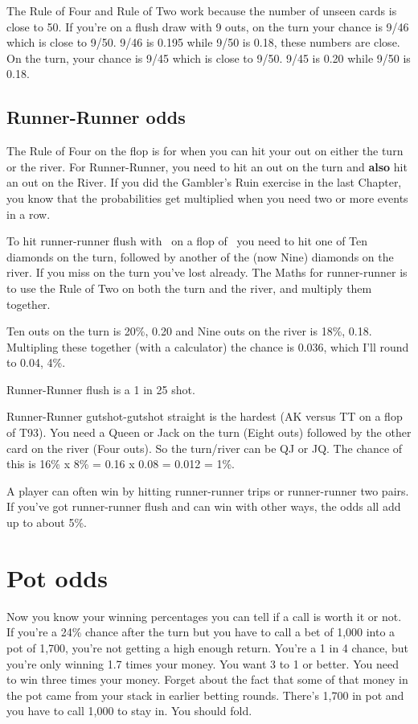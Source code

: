 The Rule of Four and Rule of Two work because the number of unseen
cards is close to 50. If you're on a flush draw with 9 outs, on the
turn your chance is 9/46 which is close to 9/50. 9/46 is 0.195 while
9/50 is 0.18, these numbers are close. On the turn, your chance is
9/45 which is close to 9/50. 9/45 is 0.20 while 9/50 is 0.18.

\subsection{Runner-Runner odds}

The Rule of Four on the flop is for when you can hit your out on
either the turn or the river. For Runner-Runner, you need to hit an
out on the turn and \textbf{also} hit an out on the River. If you did
the Gambler's Ruin exercise in the last Chapter, you know that the
probabilities get multiplied when you need two or more events in a
row.

To hit runner-runner flush with \eigd\fourd\ on a flop of \Ad\Qh\ninec\,
you need to hit one of Ten diamonds on the turn, followed by another
of the (now Nine) diamonds on the river. If you miss on the turn
you've lost already. The Maths for runner-runner is to use the Rule of
Two on both the turn and the river, and multiply them together.

Ten outs on the turn is 20\%, 0.20 and Nine outs on the river is
18\%, 0.18. Multipling these together (with a calculator) the chance
is 0.036, which I'll round to 0.04, 4\%.

Runner-Runner flush is a 1 in 25 shot.

Runner-Runner gutshot-gutshot straight is the hardest (AK versus TT on
a flop of T93). You need a Queen or Jack on the turn (Eight outs)
followed by the other card on the river (Four outs). So the turn/river
can be QJ or JQ. The chance of this is 16\% x 8\% = 0.16 x 0.08 =
0.012 = 1\%.

A player can often win by hitting runner-runner trips or runner-runner
two pairs. If you've got runner-runner flush and can win with other
ways, the odds all add up to about 5\%.

\section{Pot odds}

Now you know your winning percentages you can tell if a call is worth
it or not. If you're a 24\% chance after the turn but you have to call
a bet of 1,000 into a pot of 1,700, you're not getting a high enough
return. You're a 1 in 4 chance, but you're only winning 1.7 times your
money. You want 3 to 1 or better. You need to win three times your
money. Forget about the fact that some of that money in the pot came
from your stack in earlier betting rounds. There's 1,700 in pot and
you have to call 1,000 to stay in. You should fold.

